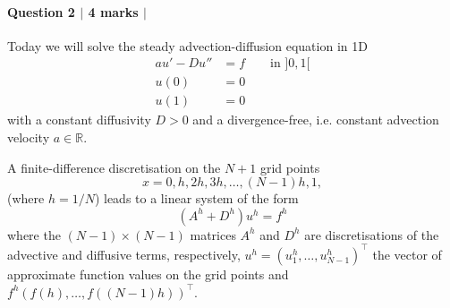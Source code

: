 \documentclass[10pt,letterpaper]{scrartcl}
\begin{document}
\newpage

\paragraph*{Question 2 $\vert$ 4 marks $\vert$ \faFilePdfO}

Today we will solve the steady advection-diffusion equation in 1D
\begin{align*}
au' - D u'' &= f \qquad \text{in } ]0,1[\\
u(0) &= 0\\
u(1) &= 0
\end{align*}
with a constant diffusivity $D>0$ and a divergence-free, i.e. constant advection velocity $a \in \mathds{R}$.

A finite-difference discretisation on the $N+1$ grid points
\begin{equation*}
x = 0, h, 2h, 3h, \dots, (N-1)h, 1,
\end{equation*}
(where $h = 1/N$) leads to a linear system of the form
\begin{equation*}
\left( A^h + D^h \right) u^h = f^h
\end{equation*}
where the $(N-1) \times (N-1)$ matrices $A^h$ and $D^h$ are discretisations of the advective and diffusive terms, respectively, $u^h = (u^h_1, \dots , u^h_{N-1})^\top$ the vector of approximate function values on the grid points and $f^h (f(h), \dots , f((N-1)h))^\top$.
\end{document}

